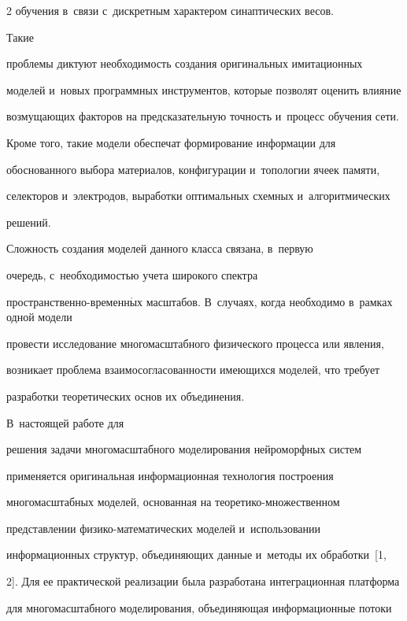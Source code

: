 \begin{multicols}{2}
обучения в~связи с~дискретным характером синаптических весов. 





Такие 


проблемы диктуют необходимость создания оригинальных имитационных 


моделей и~новых программных инструментов, которые позволят оценить влияние 


возмущающих факторов на предсказательную точность и~процесс обучения сети. 


Кроме того, такие модели обеспечат формирование информации для 


обоснованного выбора материалов, конфигурации и~топологии ячеек памяти, 


селекторов и~электродов, выработки оптимальных схемных и~алгоритмических 


решений. 





Сложность создания моделей данного класса связана, в~первую 


очередь, с~необходимостью учета широкого спектра 


про\-стран\-ст\-вен\-но-вре\-мен\-н$\acute{\mbox{ы}}$х масштабов. В~случаях, когда необходимо в~рамках одной модели 


провести исследование многомасштабного физического процесса или явления, 


возникает проб\-ле\-ма взаимосогласованности име\-ющих\-ся моделей, что требует 


разработки теоретических основ их объединения. 





В~настоящей работе для 


решения задачи многомасштабного моделирования нейроморфных сис\-тем 


применяется оригинальная информационная технология построения 


многомасштабных моделей, основанная на теоретико-множественном 


пред\-став\-ле\-нии фи\-зи\-ко-ма\-те\-ма\-ти\-че\-ских моделей и~использовании 


информационных структур, объ\-еди\-ня\-ющих данные и~методы их обработки~[1, 


2]. Для ее практической реализации была разработана интеграционная платформа 


для многомасштабного моделирования, объединяющая информационные потоки 



\end{multicols}
